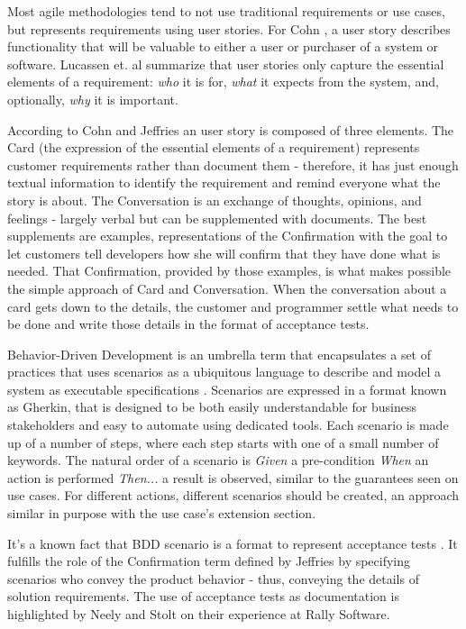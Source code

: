 Most agile methodologies tend to not use traditional requirements or use cases, but represents requirements using user stories. For Cohn \cite{Cohn_2004}, a user story describes functionality that will be valuable to either a user or purchaser of a system or software. Lucassen et. al \cite{Lucassen_et_dot_al_2015} summarize that user stories only capture the essential elements of a requirement: \textit{who} it is for, \textit{what} it expects from the system, and, optionally, \textit{why} it is important.

According to Cohn \cite{Cohn_2004} and Jeffries \cite{Jeffries_2001} an user story is composed of three elements. The Card (the expression of the essential elements of a requirement) represents customer requirements rather than document them - therefore, it has just enough textual information to identify the requirement and remind everyone what the story is about. The Conversation is an exchange of thoughts, opinions, and feelings - largely verbal but can be supplemented with documents. The best supplements are examples, representations of the Confirmation with the goal to let customers tell developers how she will confirm that they have done what is needed. That Confirmation, provided by those examples, is what makes possible the simple approach of Card and Conversation. When the conversation about a card gets down to the details, the customer and programmer settle what needs to be done and write those details in the format of acceptance tests. 

Behavior-Driven Development is an umbrella term that encapsulates a set of practices that uses scenarios as a ubiquitous language to describe and model a system as executable specifications \cite{Smart_2014}. Scenarios are expressed in a format known as Gherkin, that is designed to be both easily understandable for business stakeholders and easy to automate using dedicated tools. Each scenario is made up of a number of steps, where each step starts with one of a small number of keywords. The natural order of a scenario is \textit{Given} a pre-condition \textit{When} an action is performed \textit{Then...} a result is observed, similar to the guarantees seen on use cases. For different actions, different scenarios should be created, an approach similar in purpose with the use case's extension section.

It's a known fact that BDD scenario is a format to represent acceptance tests \cite{Gartner_2012}. It fulfills the role of the Confirmation term defined by Jeffries \cite{Jeffries_2001} by specifying scenarios who convey the product behavior - thus, conveying the details of solution requirements. The use of acceptance tests as documentation is highlighted by Neely and Stolt \cite{Neely_Stolt_2013} on their experience at Rally Software.

